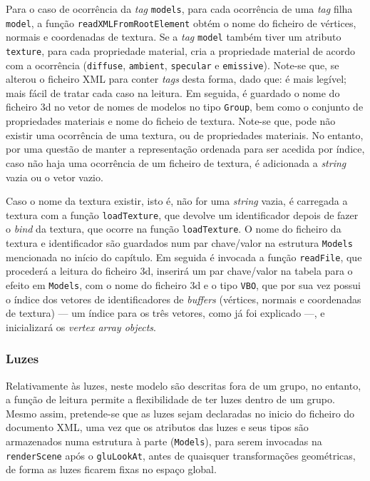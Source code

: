 Para o caso de ocorrência da \emph{tag} \texttt{models}, para cada ocorrência de
uma \emph{tag} filha \texttt{model}, a função \texttt{readXMLFromRootElement}
obtém o nome do ficheiro de vértices, normais e coordenadas de textura. Se
a \emph{tag} \texttt{model} também tiver um atributo \texttt{texture}, para cada
propriedade material, cria a propriedade material de acordo com a ocorrência
(\texttt{diffuse}, \texttt{ambient}, \texttt{specular} e \texttt{emissive}).
Note-se que, se alterou o ficheiro XML para conter \emph{tags} desta forma,
dado que:  é mais legível; mais fácil de tratar cada caso na leitura. Em
seguida, é guardado o nome do ficheiro 3d no vetor de nomes de modelos no tipo
\texttt{Group}, bem como o conjunto de propriedades materiais e nome do ficheio
de textura. Note-se que, pode não existir uma ocorrência de uma textura, ou de
propriedades materiais. No entanto, por uma questão de manter a representação
ordenada para ser acedida por índice, caso não haja uma ocorrência de um
ficheiro de textura, é adicionada a \emph{string} vazia ou o vetor vazio.

Caso o nome da textura existir, isto é, não for uma \emph{string} vazia,
é carregada a textura com a função \texttt{loadTexture}, que devolve um
identificador depois de fazer o \emph{bind} da textura, que ocorre na função
\texttt{loadTexture}. O nome do ficheiro da textura e identificador são
guardados num par chave/valor na estrutura \texttt{Models} mencionada no início
do capítulo. Em seguida é invocada a função \texttt{readFile}, que procederá
a leitura do ficheiro 3d, inserirá um par chave/valor na tabela para o efeito em
\texttt{Models}, com o nome do ficheiro 3d e o tipo \texttt{VBO}, que por sua
vez possui o índice dos vetores de identificadores de \emph{buffers} (vértices,
normais e coordenadas de textura) --- um índice para os três vetores, como já
foi explicado ---, e inicializará os \emph{vertex array objects}.      



\subsubsection{Luzes}

Relativamente às luzes, neste modelo são descritas fora de um grupo, no entanto,
a função de leitura permite a flexibilidade de ter luzes dentro de um grupo.
Mesmo assim, pretende-se que as luzes sejam declaradas no inicio do ficheiro do
documento XML, uma vez que os atributos das luzes e seus tipos são armazenados
numa estrutura à parte (\texttt{Models}), para serem invocadas na
\texttt{renderScene} após o \texttt{gluLookAt}, antes de quaisquer
transformações geométricas, de forma as luzes ficarem fixas no espaço global.

